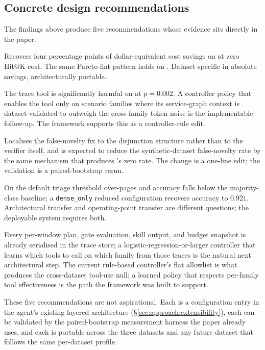 \subsection{Concrete design recommendations}
\label{sec:discussion:recommendations}

The findings above produce five recommendations whose evidence sits directly in the paper.

 Recovers four percentage points of dollar-equivalent cost savings on \dsob{} at zero Hit@K cost. The same Pareto-flat pattern holds on \dsotel{}. Dataset-specific in absolute savings, architecturally portable.

 The trace tool is significantly harmful on \dsob{} at $p = 0.002$. A controller policy that enables the tool only on scenario families where its service-graph context is dataset-validated to outweigh the cross-family token noise is the implementable follow-up. The framework supports this as a controller-rule edit.

 Localises the false-novelty fix to the disjunction structure rather than to the verifier itself, and is expected to reduce the synthetic-dataset false-novelty rate by the same mechanism that produces \dswol{}'s zero rate. The change is a one-line edit; the validation is a paired-bootstrap rerun.

 On \dswol{} the default triage threshold over-pages and accuracy falls below the majority-class baseline; a \texttt{dense\_only} reduced configuration recovers accuracy to $0.921$. Architectural transfer and operating-point transfer are different questions; the deployable system requires both.

 Every per-window plan, gate evaluation, skill output, and budget snapshot is already serialised in the trace store; a logistic-regression-or-larger controller that learns which tools to call on which family from those traces is the natural next architectural step. The current rule-based controller's flat allowlist is what produces the cross-dataset tool-use null; a learned policy that respects per-family tool effectiveness is the path the framework was built to support.

These five recommendations are not aspirational. Each is a configuration entry in the agent's existing layered architecture (\S\ref{sec:approach:extensibility}), each can be validated by the paired-bootstrap measurement harness the paper already uses, and each is portable across the three datasets and any future dataset that follows the same per-dataset profile.
